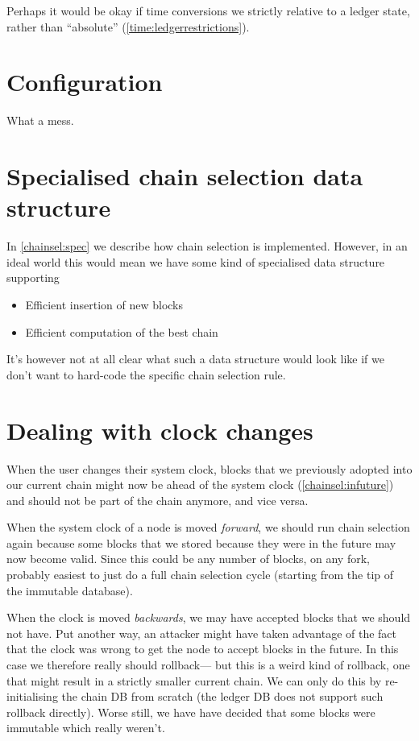 Perhaps it would be okay if time conversions we strictly relative to a ledger
state, rather than ``absolute'' (\cref{time:ledgerrestrictions}).

\section{Configuration}

What a mess.

\section{Specialised chain selection data structure}

In \cref{chainsel:spec} we describe how chain selection is implemented. However,
in an ideal world this would mean we have some kind of specialised data
structure supporting

\begin{itemize}
\item Efficient insertion of new blocks
\item Efficient computation of the best chain
\end{itemize}

It's however not at all clear what such a data structure would look like if we
don't want to hard-code the specific chain selection rule.

\section{Dealing with clock changes}
\label{future:clockchanges}

When the user changes their system clock, blocks that we previously adopted
into our current chain might now be ahead of the system clock (\cref{chainsel:infuture}) and should not
be part of the chain anymore, and vice versa.

When the system clock of a node is moved \emph{forward}, we should run chain
selection again because some blocks that we stored because they were in the
future may now become valid. Since this could be any number of blocks, on any
fork, probably easiest to just do a full chain selection cycle (starting from
the tip of the immutable database).

When the clock is moved \emph{backwards}, we may have accepted blocks that we
should not have. Put another way, an attacker might have taken advantage of the
fact that the clock was wrong to get the node to accept blocks in the future. In
this case we therefore really should rollback--- but this is a weird kind of
rollback, one that might result in a strictly smaller current chain. We can only
do this by re-initialising the chain DB from scratch (the ledger DB does not
support such rollback directly). Worse still, we have have decided that some
blocks were immutable which really weren't.

